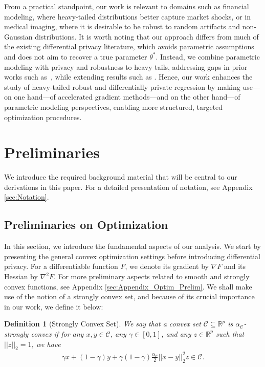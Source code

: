 \documentclass{article}
\newtheorem{definition}{Definition}[section]
\begin{document}
From a practical standpoint, our work is relevant to domains such as financial modeling, where heavy-tailed distributions better capture market shocks, or in medical imaging, where it is desirable to be robust to random artifacts and non-Gaussian distributions. It is worth noting that our approach differs from much of the existing differential privacy literature, which avoids parametric assumptions and does not aim to recover a true parameter $\theta^*$. Instead, we combine parametric modeling with privacy and robustness to heavy tails, addressing gaps in prior works such as~\cite{NOPL, BOLT_ON_PRIV, EFF_PRIV_SMOOTH}, while extending results such as \cite{RE}. Hence, our work enhances the study of heavy-tailed robust and differentially private regression by making use---on one hand---of accelerated gradient methods---and on the other hand---of parametric modeling perspectives, enabling more structured, targeted optimization procedures.


\section{Preliminaries}\label{sec:Notation and Preliminaries}

We introduce the required background material that will be central to our derivations in this paper. For a detailed presentation of notation, see Appendix \ref{sec:Notation}.

\subsection{Preliminaries on Optimization} \label{sec:Preliminaries on Optimization}

In this section, we introduce the fundamental aspects of our analysis. We start by presenting 
the general convex optimization settings before introducing differential privacy. For a differentiable function $F$, we denote its gradient by $\nabla F$ and its Hessian by $\nabla^2 F$. For more preliminary aspects related to smooth and strongly convex functions, see Appendix \ref{sec:Appendix_Optim_Prelim}. We shall make use of the notion of a strongly convex set, and because of its crucial importance in our work, we define it below:

\begin{definition}[Strongly Convex Set]
We say that a convex set $\mathcal{C} \subseteq \mathbb{R}^p$ is $\alpha_{\mathcal{C}}$-strongly convex if for any $x, y \in \mathcal{C}$, any $\gamma \in [0, 1]$, and any $z \in \mathbb{R}^p$ such
that $||z||_2 = 1$, we have
\begin{align*}
\gamma x + (1 - \gamma)y + \gamma(1 - \gamma)\frac{\alpha_{\mathcal{C}}}{2}||x - y||_2^2z \in \mathcal{C}.
\end{align*}
\end{definition}
\end{document}
